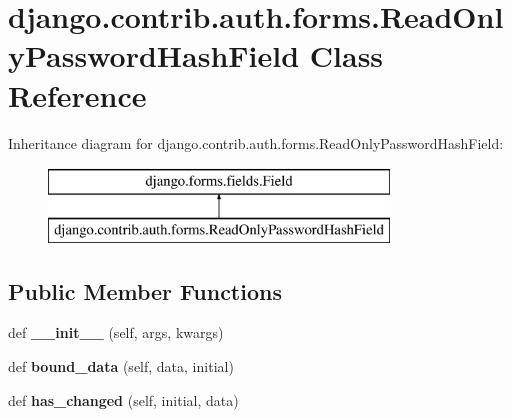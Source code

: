 \hypertarget{classdjango_1_1contrib_1_1auth_1_1forms_1_1_read_only_password_hash_field}{}\section{django.\+contrib.\+auth.\+forms.\+Read\+Only\+Password\+Hash\+Field Class Reference}
\label{classdjango_1_1contrib_1_1auth_1_1forms_1_1_read_only_password_hash_field}
Inheritance diagram for django.\+contrib.\+auth.\+forms.\+Read\+Only\+Password\+Hash\+Field\+:\begin{figure}[H]
\begin{center}
\leavevmode
\includegraphics[height=2.000000cm]{classdjango_1_1contrib_1_1auth_1_1forms_1_1_read_only_password_hash_field}
\end{center}
\end{figure}
\subsection*{Public Member Functions}
\begin{DoxyCompactItemize}
\item 
\mbox{\label{classdjango_1_1contrib_1_1auth_1_1forms_1_1_read_only_password_hash_field_a1ed5898050e89fef67742f48e40f475b}} 
def {\bfseries \+\_\+\+\_\+init\+\_\+\+\_\+} (self, args, kwargs)
\item 
\mbox{\label{classdjango_1_1contrib_1_1auth_1_1forms_1_1_read_only_password_hash_field_a4716b3ba80ef72cc76c618ddd748fa9a}} 
def {\bfseries bound\+\_\+data} (self, data, initial)
\item 
\mbox{\label{classdjango_1_1contrib_1_1auth_1_1forms_1_1_read_only_password_hash_field_a25d20e2c4c4b6244e59fa1a5d0cf21e8}} 
def {\bfseries has\+\_\+changed} (self, initial, data)
\end{DoxyCompactItemize}
